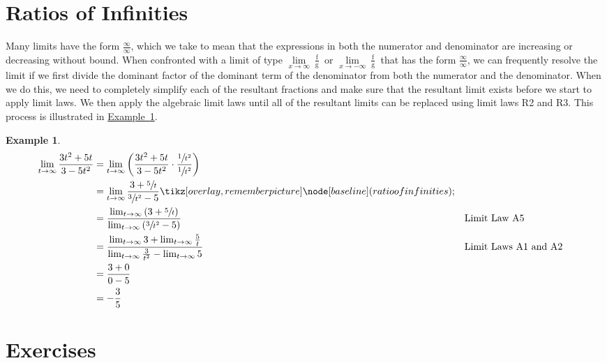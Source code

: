\documentclass[12pt,]{book}
\theoremstyle{plain}
\theoremstyle{definition}
\newtheorem{example}[theorem]{Example}
\numberwithin{equation}{section}
\newcommand{\tikzmark}[1]{\tikz[overlay,remember picture] \node[baseline] (#1) {};}%
\newcommand{\fe}[2]{\mathop{{#1}{\left(#2\right)}}}
\begin{document}
\section[Ratios of Infinities]{Ratios of Infinities}\label{section-ratios-of-infinities}
Many limits have the form \(\frac{\infty}{\infty}\), which we take to mean that the expressions in both the numerator and denominator are increasing or decreasing without bound. When confronted with a limit of type \(\lim\limits_{x\to\infty}\frac{\fe{f}{x}}{\fe{g}{x}}\) or \(\lim\limits_{x\to-\infty}\frac{\fe{f}{x}}{\fe{g}{x}}\) that has the form \(\frac{\infty}{\infty}\), we can frequently resolve the limit if we first divide the dominant factor of the dominant term of the denominator from both the numerator and the denominator. When we do this, we need to completely simplify each of the resultant fractions and make sure that the resultant limit exists before we start to apply limit laws. We then apply the algebraic limit laws until all of the resultant limits can be replaced using limit laws R2 and R3. This process is illustrated in \hyperref[example-ratio-of-infinities]{Example~\ref*{example-ratio-of-infinities}}.%
\begin{example}\label{example-ratio-of-infinities}
\begin{align*}
\lim_{t\to\infty}\frac{3t^2+5t}{3-5t^2}&=\lim_{t\to\infty}\left(\frac{3t^2+5t}{3-5t^2}\cdot\frac{\sfrac{1}{t^2}}{\sfrac{1}{t^2}}\right)\\
&=\lim_{t\to\infty}\frac{3+\sfrac{5}{t}}{\sfrac{3}{t^2}-5}\tikzmark{ratio of infinities}\\
&=\frac{\lim_{t\to\infty}\left(3+\sfrac{5}{t}\right)}{\lim_{t\to\infty}\left(\sfrac{3}{t^2}-5\right)}&&\text{Limit Law A5}\\
&=\frac{\lim_{t\to\infty}3+\lim_{t\to\infty}\frac{5}{t}}{\lim_{t\to\infty}\frac{3}{t^2}-\lim_{t\to\infty}5}&&\text{Limit Laws A1 and A2}\\
&=\frac{3+0}{0-5}\\
&=-\frac{3}{5}
\end{align*}%
\end{example}
\typeout{************************************************}
\typeout{************************************************}
\section*{Exercises}\label{exercises-10}
\end{document}
